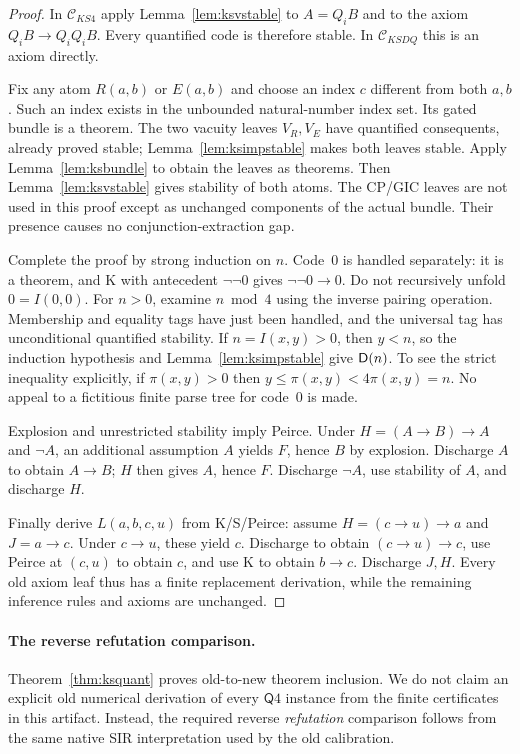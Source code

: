 \begin{proof}
In $\mathcal C_{KS4}$ apply Lemma~\ref{lem:ksvstable} to
$A=Q_iB$ and to the axiom $Q_iB\to Q_iQ_iB$. Every quantified code is
therefore stable. In $\mathcal C_{KSDQ}$ this is an axiom directly.

Fix any atom $R(a,b)$ or $E(a,b)$ and choose an index $c$ different
from both $a,b$. Such an index exists in the unbounded natural-number
index set. Its gated bundle is a theorem. The two vacuity leaves
$V_R,V_E$ have quantified consequents, already proved stable;
Lemma~\ref{lem:ksimpstable} makes both leaves stable. Apply
Lemma~\ref{lem:ksbundle} to obtain the leaves as theorems. Then
Lemma~\ref{lem:ksvstable} gives stability of both atoms. The CP/GIC
leaves are not used in this proof except as unchanged components of
the actual bundle. Their presence causes no conjunction-extraction gap.

Complete the proof by strong induction on $n$. Code~0 is handled
separately: it is a theorem, and K with antecedent $\neg\neg0$ gives
$\neg\neg0\to0$. Do not recursively unfold $0=I(0,0)$.
For $n>0$, examine $n\bmod4$ using the inverse pairing operation.
Membership and equality tags have just been handled, and the universal
tag has unconditional quantified stability. If $n=I(x,y)>0$, then
$y<n$, so the induction hypothesis and Lemma~\ref{lem:ksimpstable}
give $\mathsf{D}(n)$. To see the strict inequality explicitly, if
$\pi(x,y)>0$ then $y\le\pi(x,y)<4\pi(x,y)=n$.
No appeal to a fictitious finite parse tree for code~0 is made.

Explosion and unrestricted stability imply Peirce. Under
$H=(A\to B)\to A$ and $\neg A$, an additional assumption $A$ yields
$F$, hence $B$ by explosion. Discharge $A$ to obtain $A\to B$;
$H$ then gives $A$, hence $F$. Discharge $\neg A$, use stability of
$A$, and discharge $H$.

Finally derive $L(a,b,c,u)$ from K/S/Peirce: assume
$H=(c\to u)\to a$ and $J=a\to c$. Under $c\to u$, these yield $c$.
Discharge to obtain $(c\to u)\to c$, use Peirce at $(c,u)$ to obtain
$c$, and use K to obtain $b\to c$. Discharge $J,H$.
Every old axiom leaf thus has a finite replacement derivation, while
the remaining inference rules and axioms are unchanged.
\end{proof}

\paragraph{The reverse refutation comparison.}
Theorem~\ref{thm:ksquant} proves old-to-new theorem inclusion. We do not
claim an explicit old numerical derivation of every $\mathsf Q4$ instance
from the finite certificates in this artifact. Instead, the required
reverse \emph{refutation} comparison follows from the same native SIR
interpretation used by the old calibration.

